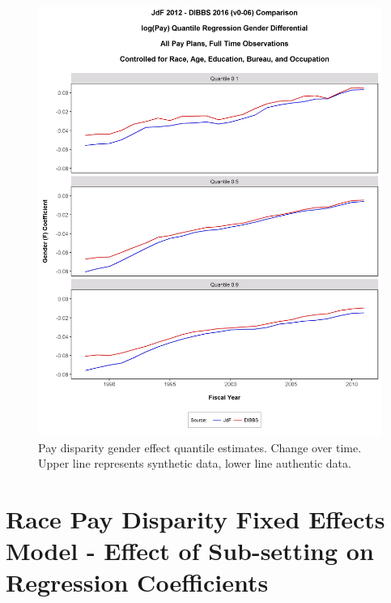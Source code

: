 \documentclass[10pt, letterpaper]{article}
\begin{document}
\begin{spacing}{1.0}
\begin{figure}[h]
    \centering
    \includegraphics[width=4.85in, trim={0 0.75in 0 1.5in}, clip]{GenderPayDifferentialQuantileRegressionAgeRaceEdPanelv0-06.png}
    \caption{Pay disparity gender effect quantile estimates.  Change over time.  Upper line represents synthetic data, lower line authentic data.}
    \label{figure:GenderPayDifferentialQuantileRegressionAgeRaceEdPanelv0-06}
\end{figure}

\clearpage

\section{Race Pay Disparity Fixed Effects Model - Effect of Sub-setting on Regression Coefficients}


\end{spacing}
\end{document}

